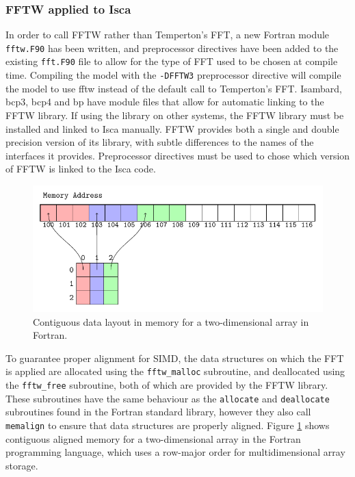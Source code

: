 \documentclass[a4paper,11pt]{report}
\begin{document}
\subsubsection{FFTW applied to Isca}
In order to call FFTW rather than Temperton's FFT, a new Fortran module \texttt{fftw.F90} has been written, and preprocessor directives have been added to the existing \texttt{fft.F90} file to allow for the type of FFT used to be chosen at compile time. Compiling the model with the \texttt{-DFFTW3} preprocessor directive will compile the model to use \gls{fftw} instead of the default call to Temperton's FFT. Isambard, \gls{bcp3}, \gls{bcp4} and \gls{bp} have module files that allow for automatic linking to the FFTW library. If using the library on other systems, the FFTW library must be installed and linked to Isca manually. FFTW provides both a single and double precision version of its library, with subtle differences to the names of the interfaces it provides. Preprocessor directives must be used to chose which version of FFTW is linked to the Isca code. 
\par
\begin{figure}[htbp]
\begin{center}
\includegraphics[width=\textwidth]{img/tikz-img/data_layout/data_layout.pdf}
\caption[Two-dimensional data layout in Fortran]{Contiguous data layout in memory for a two-dimensional array in Fortran.}
\label{fig:memalign}
\end{center}
\end{figure}
\par
To guarantee proper alignment for SIMD, the data structures on which the FFT is applied are allocated using the \texttt{fftw\_malloc} subroutine, and deallocated using the \texttt{fftw\_free} subroutine, both of which are provided by the FFTW library. These subroutines have the same behaviour as the \texttt{allocate} and \texttt{deallocate} subroutines found in the Fortran standard library, however they also call \texttt{memalign} to ensure that data structures are properly aligned. Figure \ref{fig:memalign} shows contiguous aligned memory for a two-dimensional array in the Fortran programming language, which uses a row-major order for multidimensional array storage.
\end{document}
